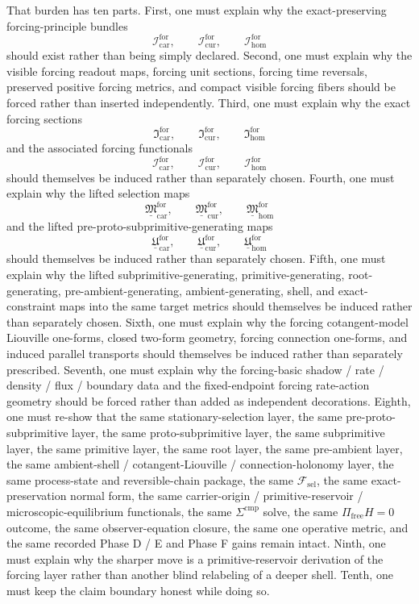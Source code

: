 \documentclass[11pt]{article}
\newcommand{\StemFunctional}{\mathscr F_{\mathrm{sel}}}
\newcommand{\Car}{\mathrm{car}}
\newcommand{\Cur}{\mathrm{cur}}
\newcommand{\Hom}{\mathrm{hom}}
\newcommand{\ForSpace}[1]{\mathcal I_{#1}^{\mathrm{for}}}
\newcommand{\ForSection}[1]{\mathfrak I_{#1}^{\mathrm{for}}}
\newcommand{\ForFunctional}[1]{\mathscr I_{#1}^{\mathrm{for}}}
\newcommand{\ForLiftedSelection}[1]{\underline{\mathfrak M}_{#1}^{\mathrm{for}}}
\newcommand{\ForLiftedPreProto}[1]{\underline{\mathfrak U}_{#1}^{\mathrm{for}}}
\begin{document}
That burden has ten parts. First, one must explain why the exact-preserving forcing-principle bundles
\[
\ForSpace{\Car},\qquad
\ForSpace{\Cur},\qquad
\ForSpace{\Hom}
\]
should exist rather than being simply declared. Second, one must explain why the visible forcing readout maps, forcing unit sections, forcing time reversals, preserved positive forcing metrics, and compact visible forcing fibers should be forced rather than inserted independently. Third, one must explain why the exact forcing sections
\[
\ForSection{\Car},\qquad
\ForSection{\Cur},\qquad
\ForSection{\Hom}
\]
and the associated forcing functionals
\[
\ForFunctional{\Car},\qquad
\ForFunctional{\Cur},\qquad
\ForFunctional{\Hom}
\]
should themselves be induced rather than separately chosen. Fourth, one must explain why the lifted selection maps
\[
\ForLiftedSelection{\Car},\qquad
\ForLiftedSelection{\Cur},\qquad
\ForLiftedSelection{\Hom}
\]
and the lifted pre-proto-subprimitive-generating maps
\[
\ForLiftedPreProto{\Car},\qquad
\ForLiftedPreProto{\Cur},\qquad
\ForLiftedPreProto{\Hom}
\]
should themselves be induced rather than separately chosen. Fifth, one must explain why the lifted subprimitive-generating, primitive-generating, root-generating, pre-ambient-generating, ambient-generating, shell, and exact-constraint maps into the same target metrics should themselves be induced rather than separately chosen. Sixth, one must explain why the forcing cotangent-model Liouville one-forms, closed two-form geometry, forcing connection one-forms, and induced parallel transports should themselves be induced rather than separately prescribed. Seventh, one must explain why the forcing-basic shadow / rate / density / flux / boundary data and the fixed-endpoint forcing rate-action geometry should be forced rather than added as independent decorations. Eighth, one must re-show that the same stationary-selection layer, the same pre-proto-subprimitive layer, the same proto-subprimitive layer, the same subprimitive layer, the same primitive layer, the same root layer, the same pre-ambient layer, the same ambient-shell / cotangent-Liouville / connection-holonomy layer, the same process-state and reversible-chain package, the same \(\StemFunctional\), the same exact-preservation normal form, the same carrier-origin / primitive-reservoir / microscopic-equilibrium functionals, the same \(\Sigma^{\mathrm{cmp}}\) solve, the same \(\Pi_{\mathrm{free}}H=0\) outcome, the same observer-equation closure, the same one operative metric, and the same recorded Phase D / E and Phase F gains remain intact. Ninth, one must explain why the sharper move is a primitive-reservoir derivation of the forcing layer rather than another blind relabeling of a deeper shell. Tenth, one must keep the claim boundary honest while doing so.
\end{document}
